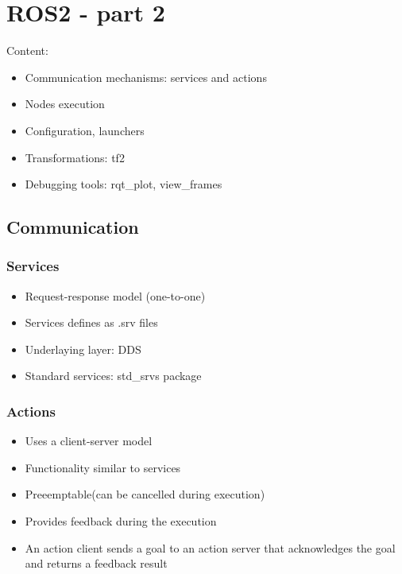 \chapter{ROS2 - part 2}
Content:
\begin{itemize}
    \item Communication mechanisms: services and actions
    \item Nodes execution
    \item Configuration, launchers
    \item Transformations: tf2
    \item Debugging tools: rqt\_plot, view\_frames
\end{itemize}
\section{Communication}
\subsection{Services}
\begin{itemize}
    \item Request-response model (one-to-one)
    \item Services defines as .srv files
    \item Underlaying layer: DDS
    \item Standard services: std\_srvs package

\end{itemize}



\subsection{Actions}

\begin{itemize}
        \item Uses a client-server model
        \item Functionality similar to services
        \item Preeemptable(can be cancelled during execution)
        \item Provides feedback during the execution
        \item An action client sends a goal to an action server that acknowledges the goal and returns a feedback result
        
\end{itemize}



